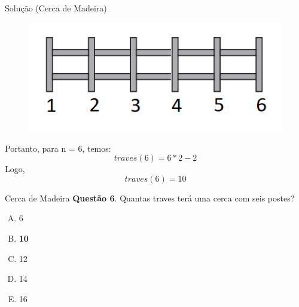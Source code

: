 \documentclass{beamer}
\begin{document}
\begin{frame}{Solução (Cerca de Madeira)}
\begin{figure}[ht]
\centering
\includegraphics[width=.6\textwidth]{postes.png}
\label{fig:exampleFig2}
\end{figure}
Portanto, para n = 6, temos:
    \begin{equation*}
        traves(6) = 6 \ast 2 - 2
    \end{equation*}
Logo,
    \begin{equation*}
        traves(6) = 10 
    \end{equation*}

\end{frame}
\begin{frame}{Cerca de Madeira}
\textbf{Questão 6}. Quantas traves terá uma cerca com
seis postes?

\begin{enumerate}[(A)]
    \item 6
    \item \textbf{10}
    \item 12
    \item 14
    \item 16
\end{enumerate}

\end{frame}
\end{document}
